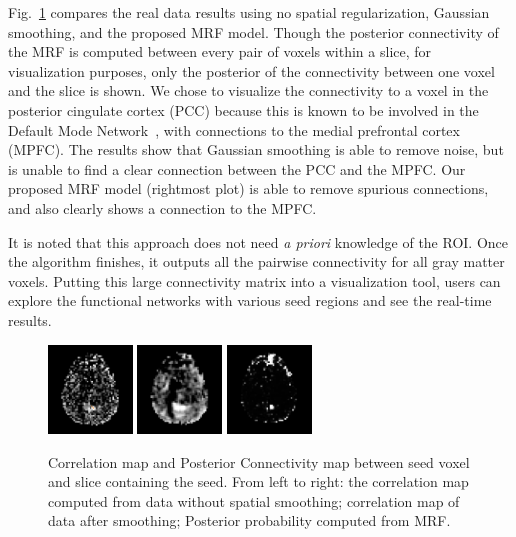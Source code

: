 \documentclass[12pt]{article}
\begin{document}
Fig.~\ref{fig:mrfvssmoothing} compares the real data results using no spatial
regularization, Gaussian smoothing, and the proposed MRF model. Though the
posterior connectivity of the MRF is computed between every pair of voxels
within a slice, for visualization purposes, only the posterior of the
connectivity between one voxel and the slice is shown. We chose to visualize the
connectivity to a voxel in the posterior cingulate cortex (PCC) because this is
known to be involved in the Default Mode Network~\cite{raichle2001}, with
connections to the medial prefrontal cortex (MPFC). The results show that
Gaussian smoothing is able to remove noise, but is unable to find a clear
connection between the PCC and the MPFC. Our proposed MRF model (rightmost plot)
is able to remove spurious connections, and also clearly shows a connection to
the MPFC.

It is noted that this approach does not need \emph{a priori} knowledge of the
ROI. Once the algorithm finishes, it outputs all the pairwise connectivity for
all gray matter voxels. Putting this large connectivity matrix into a
visualization tool, users can explore the functional networks with various seed
regions and see the real-time results.

\begin{figure}[thb]
  \centering
  \includegraphics[width = 0.2\textwidth]{figures/no_overlay/R1_corr_nosmooth}
  \includegraphics[width = 0.2\textwidth]{figures/no_overlay/R1_corr_smooth}
  \includegraphics[width = 0.2\textwidth]{figures/no_overlay/R1_mrf}
  \caption{Correlation map and Posterior Connectivity map between seed voxel
    and slice containing the seed. From left to right: the correlation
    map computed from data without spatial smoothing;  correlation map of
    data after smoothing; Posterior probability computed from MRF.}
  \label{fig:mrfvssmoothing}
\end{figure}
\end{document}
